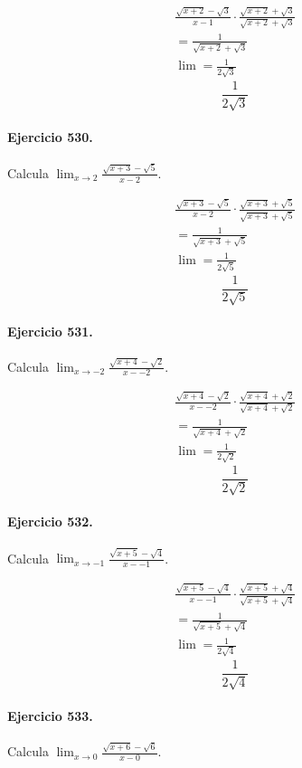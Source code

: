 \documentclass[11pt,a4paper]{article}
\begin{document}
\[
\begin{aligned}
\frac{\sqrt{x+2}-\sqrt{3}}{x-1}\cdot \frac{\sqrt{x+2}+\sqrt{3}}{\sqrt{x+2}+\sqrt{3}}\\
=\frac{1}{\sqrt{x+2}+\sqrt{3}}\\
\lim=\frac{1}{2\sqrt{3}}
\end{aligned}
\]
\[\boxed{\frac{1}{2\sqrt{3}}}\]


\paragraph{Ejercicio 530.} Calcula $\displaystyle\lim_{x\to 2}\frac{\sqrt{x+3}-\sqrt{5}}{x-2}$.

\[
\begin{aligned}
\frac{\sqrt{x+3}-\sqrt{5}}{x-2}\cdot \frac{\sqrt{x+3}+\sqrt{5}}{\sqrt{x+3}+\sqrt{5}}\\
=\frac{1}{\sqrt{x+3}+\sqrt{5}}\\
\lim=\frac{1}{2\sqrt{5}}
\end{aligned}
\]
\[\boxed{\frac{1}{2\sqrt{5}}}\]


\paragraph{Ejercicio 531.} Calcula $\displaystyle\lim_{x\to -2}\frac{\sqrt{x+4}-\sqrt{2}}{x--2}$.

\[
\begin{aligned}
\frac{\sqrt{x+4}-\sqrt{2}}{x--2}\cdot \frac{\sqrt{x+4}+\sqrt{2}}{\sqrt{x+4}+\sqrt{2}}\\
=\frac{1}{\sqrt{x+4}+\sqrt{2}}\\
\lim=\frac{1}{2\sqrt{2}}
\end{aligned}
\]
\[\boxed{\frac{1}{2\sqrt{2}}}\]


\paragraph{Ejercicio 532.} Calcula $\displaystyle\lim_{x\to -1}\frac{\sqrt{x+5}-\sqrt{4}}{x--1}$.

\[
\begin{aligned}
\frac{\sqrt{x+5}-\sqrt{4}}{x--1}\cdot \frac{\sqrt{x+5}+\sqrt{4}}{\sqrt{x+5}+\sqrt{4}}\\
=\frac{1}{\sqrt{x+5}+\sqrt{4}}\\
\lim=\frac{1}{2\sqrt{4}}
\end{aligned}
\]
\[\boxed{\frac{1}{2\sqrt{4}}}\]


\paragraph{Ejercicio 533.} Calcula $\displaystyle\lim_{x\to 0}\frac{\sqrt{x+6}-\sqrt{6}}{x-0}$.
\end{document}
